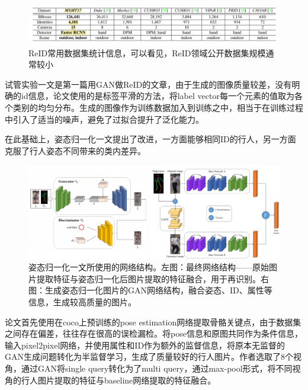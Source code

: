\begin{figure}
	\centering
	\captionsetup{width=.88\linewidth}
	\includegraphics[width=\linewidth,keepaspectratio]{data/kaitibaogao/dataset.png}
	\caption{\kaiti ReID常用数据集统计信息，可以看见，ReID领域公开数据集规模通常较小}
	\label{figure:dataset}
\end{figure}

试管实验一文\cite{zheng2017unlabeled}是第一篇用GAN做ReID的文章，由于生成的图像质量较差，没有明确的id信息，论文使用的是标签平滑的方法，将label vector每一个元素的值取为各个类别的均匀分布。生成的图像作为训练数据加入到训练之中，相当于在训练过程中引入了适当的噪声，避免了过拟合提升了泛化能力。

在此基础上，姿态归一化一文\cite{qian2017pose}提出了改进，一方面能够相同ID的行人，另一方面克服了行人姿态不同带来的类内差异。

\begin{figure}
	\centering
	\captionsetup{width=.88\linewidth}
	\includegraphics[width=\linewidth,keepaspectratio]{data/kaitibaogao/pose-norm.png}
	\caption{\kaiti 姿态归一化一文\cite{qian2017pose}所使用的网络结构。左图：最终网络结构——原始图片提取特征与姿态归一化后图片提取的特征融合，用于再识别。右图：生成姿态归一化图片的GAN网络结构，融合姿态、ID、属性等信息，生成较高质量的图片。}
	\label{figure:pose-norm}
\end{figure}

论文首先使用在coco上预训练的pose estimation网络提取骨骼关键点，由于数据集之间存在偏差，往往存在很高的误检漏检。将pose信息和原图共同作为条件信息，输入pixel2pixel网络，并使用属性和ID作为额外的监督信息，将原本无监督的GAN生成问题转化为半监督学习，生成了质量较好的行人图片。作者选取了8个视角，通过GAN将single query转化为了multi query，通过max-pool形式，将不同视角的行人图片提取的特征与baseline网络提取的特征融合。

